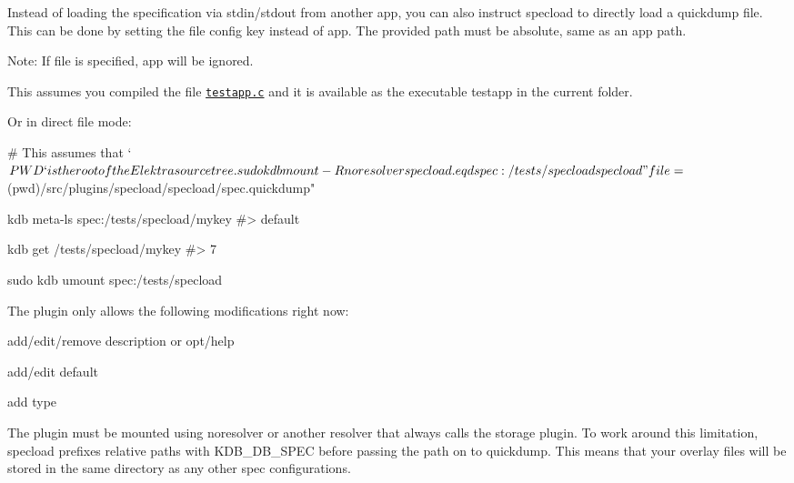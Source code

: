 Instead of loading the specification via {\ttfamily stdin}/{\ttfamily stdout} from another app, you can also instruct {\ttfamily specload} to directly load a {\ttfamily quickdump} file. This can be done by setting the {\ttfamily file} config key instead of {\ttfamily app}. The provided path must be absolute, same as an {\ttfamily app} path.

Note\+: If {\ttfamily file} is specified, {\ttfamily app} will be ignored.

This assumes you compiled the file \href{/home/jenkins/workspace/libelektra-release/src/plugins/specload/testapp.c}{\tt {\ttfamily testapp.\+c}} and it is available as the executable {\ttfamily testapp} in the current folder.




Or in direct file mode\+:


\begin{DoxyCode}
# This assumes that `$PWD` is the root of the Elektra source tree.
sudo kdb mount -R noresolver specload.eqd spec:/tests/specload specload
       "file=$(pwd)/src/plugins/specload/specload/spec.quickdump"

kdb meta-ls spec:/tests/specload/mykey
#> default

kdb get /tests/specload/mykey
#> 7

sudo kdb umount spec:/tests/specload
\end{DoxyCode}



\begin{DoxyItemize}
\item The plugin only allows the following modifications right now\+:
\begin{DoxyItemize}
\item add/edit/remove {\ttfamily description} or {\ttfamily opt/help}
\item add/edit {\ttfamily default}
\item add {\ttfamily type}
\end{DoxyItemize}
\item The plugin must be mounted using {\ttfamily noresolver} or another resolver that always calls the storage plugin. To work around this limitation, {\ttfamily specload} prefixes relative paths with {\ttfamily K\+D\+B\+\_\+\+D\+B\+\_\+\+S\+P\+EC} before passing the path on to {\ttfamily quickdump}. This means that your overlay files will be stored in the same directory as any other {\ttfamily spec} configurations. 
\end{DoxyItemize}